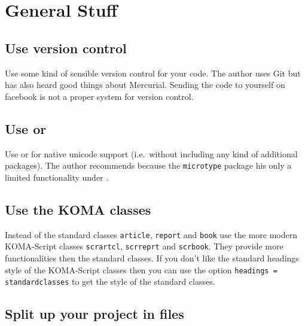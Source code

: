 \chapter{General Stuff}





\section{Use version control}

Use some kind of sensible version control for your code.
The author uses Git but has also heard good things about Mercurial.
Sending the code to yourself on facebook is not a proper system for version control.





\section{Use  or }

Use  or  for native unicode support (i.e.\ without including any kind of additional packages).
The author recommends  because the \texttt{microtype} package his only a limited functionality under .





\section{Use the KOMA classes}

Instead of the standard classes \texttt{article}, \texttt{report} and \texttt{book} use the more modern KOMA-Script classes \texttt{scrartcl}, \texttt{scrreprt} and \texttt{scrbook}.
They provide more functionalities then the standard classes.
If you don’t like the standard headings style of the KOMA-Script classes then you can use the option \texttt{headings = standardclasses} to get the style of the standard classes.





\section{Split up your project in files}


